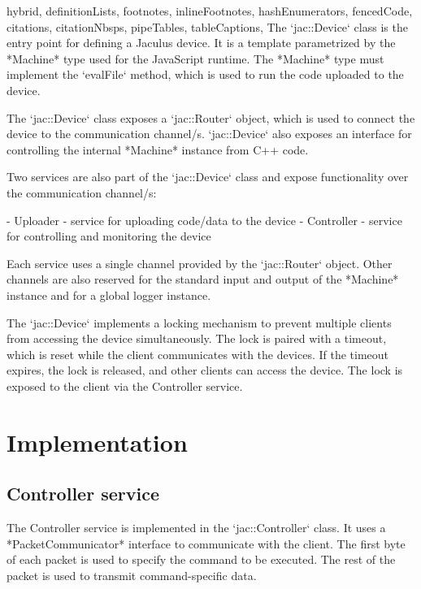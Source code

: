 \documentclass[
  digital,
  oneside,
  nosansbold,
  nocolorbold,
  lof,
  lot
]{fithesis4}
\begin{document}
\begin{markdown*}{%
  hybrid,
  definitionLists,
  footnotes,
  inlineFootnotes,
  hashEnumerators,
  fencedCode,
  citations,
  citationNbsps,
  pipeTables,
  tableCaptions,
}
The `jac::Device` class is the entry point for defining a Jaculus device. It is a template parametrized by the *Machine* type used for the JavaScript runtime. The *Machine* type must implement the `evalFile` method, which is used to run the code uploaded to the device.

The `jac::Device` class exposes a `jac::Router` object, which is used to connect the device to the communication channel/s. `jac::Device` also exposes an interface for controlling the internal *Machine* instance from C++ code.

Two services are also part of the `jac::Device` class and expose functionality over the communication channel/s:

  - Uploader - service for uploading code/data to the device
  - Controller - service for controlling and monitoring the device

Each service uses a single channel provided by the `jac::Router` object. Other channels are also reserved for the standard input and output of the *Machine* instance and for a global logger instance.

The `jac::Device` implements a locking mechanism to prevent multiple clients from accessing the device simultaneously. The lock is paired with a timeout, which is reset while the client communicates with the devices. If the timeout expires, the lock is released, and other clients can access the device. The lock is exposed to the client via the Controller service.


\section{Implementation}

\subsection{Controller service}

The Controller service is implemented in the `jac::Controller` class. It uses a *PacketCommunicator* interface to communicate with the client. The first byte of each packet is used to specify the command to be executed. The rest of the packet is used to transmit command-specific data.


\end{markdown*}
\end{document}
